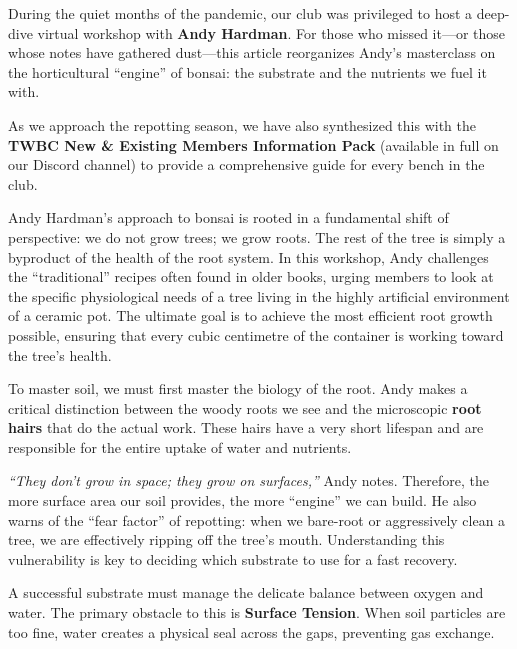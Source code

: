 \label{2026-01-hardman-report}

\noindent
During the quiet months of the pandemic, our club was privileged to host a deep-dive virtual workshop with \textbf{Andy Hardman}.
For those who missed it---or those whose notes have gathered dust---this article reorganizes Andy's masterclass on the horticultural ``engine'' of bonsai: the substrate and the nutrients we fuel it with.

As we approach the repotting season, we have also synthesized this with the \textbf{TWBC New \& Existing Members Information Pack} (available in full on our Discord channel) to provide a comprehensive guide for every bench in the club.

\noindent
Andy Hardman's approach to bonsai is rooted in a fundamental shift of perspective: we do not grow trees; we grow roots.
The rest of the tree is simply a byproduct of the health of the root system.
In this workshop, Andy challenges the ``traditional'' recipes often found in older books, urging members to look at the specific physiological needs of a tree living in the highly artificial environment of a ceramic pot.
The ultimate goal is to achieve the most efficient root growth possible, ensuring that every cubic centimetre of the container is working toward the tree's health.

\noindent
To master soil, we must first master the biology of the root.
Andy makes a critical distinction between the woody roots we see and the microscopic \textbf{root hairs} that do the actual work.
These hairs have a very short lifespan and are responsible for the entire uptake of water and nutrients.

\textit{``They don't grow in space; they grow on surfaces,''} Andy notes.
Therefore, the more surface area our soil provides, the more ``engine'' we can build.
He also warns of the ``fear factor'' of repotting: when we bare\--root or aggressively clean a tree, we are effectively ripping off the tree's mouth.
Understanding this vulnerability is key to deciding which substrate to use for a fast recovery.

\noindent
A successful substrate must manage the delicate balance between oxygen and water.
The primary obstacle to this is \textbf{Surface Tension}.
When soil particles are too fine, water creates a physical seal across the gaps, preventing gas exchange.

